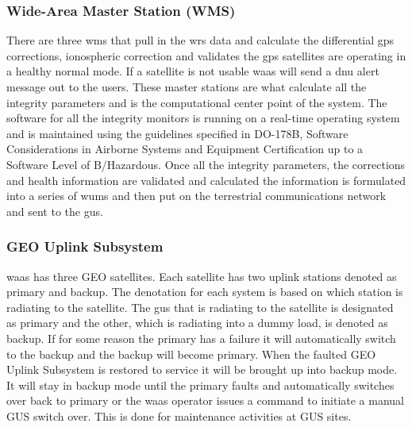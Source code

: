 \subsubsection{Wide-Area Master Station (WMS)}\label{waas-master-stations}

There are three \ac{wms} that pull in the \ac{wrs} data and
calculate the differential \ac{gps} corrections, ionospheric correction and
validates the \ac{gps} satellites are operating in a healthy normal mode. If
a satellite is not usable \ac{waas} will send a \ac{dnu} alert
message out to the users. These master stations are what calculate all
the integrity parameters and is the computational center point of the
system. The software for all the integrity monitors is running on a
real-time operating system and is maintained using the guidelines
specified in DO-178B, Software Considerations in Airborne Systems and
Equipment Certification up to a Software Level of B/Hazardous. Once all
the integrity parameters, the corrections and health information are
validated and calculated the information is formulated into a series of
\acp{wum} and then put on the terrestrial communications
network and sent to the \ac{gus}.

\subsubsection{GEO Uplink Subsystem}\label{geo-uplink-subsystem}

\ac{waas} has three GEO satellites. Each satellite has two uplink stations
denoted as primary and backup. The denotation for each system is based
on which station is radiating to the satellite. The \ac{gus}
that is radiating to the satellite is designated as primary and the
other, which is radiating into a dummy load, is denoted as backup. If
for some reason the primary has a failure it will automatically switch
to the backup and the backup will become primary. When the faulted GEO
Uplink Subsystem is restored to service it will be brought up into
backup mode. It will stay in backup mode until the primary faults and
automatically switches over back to primary or the \ac{waas} operator issues
a command to initiate a manual GUS switch over. This is done for
maintenance activities at GUS sites.

